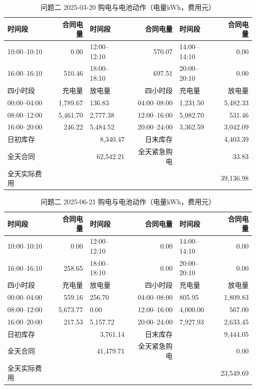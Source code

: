 \begin{table}[H]\centering\small\setlength{\tabcolsep}{4pt}\caption{问题二 2025-03-20 购电与电池动作（电量kWh，费用元）}\begin{tabular}{lrlrlr}\toprule
时间段&合同电量&时间段&合同电量&时间段&合同电量\\\midrule
10:00--10:10 & 0.00 & 12:00--12:10 & 570.07 & 14:00--14:10 & 0.00\\
16:00--16:10 & 510.46 & 18:00--18:10 & 697.51 & 20:00--20:10 & 0.00\\
\midrule 四小时段&充电量&放电量&四小时段&充电量&放电量\\\midrule
00:00--04:00 & 1,789.67 & 136.83 & 04:00--08:00 & 1,231.50 & 5,482.33\\
08:00--12:00 & 5,461.70 & 2,777.38 & 12:00--16:00 & 5,082.70 & 531.46\\
16:00--20:00 & 246.22 & 5,484.52 & 20:00--24:00 & 3,362.59 & 3,042.09\\
\midrule 日初库存 & \multicolumn{2}{r}{8,340.47} & 日末库存 & \multicolumn{2}{r}{4,403.39}\\
全天合同 & \multicolumn{2}{r}{62,542.21} & 全天紧急购电 & \multicolumn{2}{r}{33.83}\\
全天实际费用 & \multicolumn{5}{r}{39,136.98}\\\bottomrule\end{tabular}\end{table}
\begin{table}[H]\centering\small\setlength{\tabcolsep}{4pt}\caption{问题二 2025-06-21 购电与电池动作（电量kWh，费用元）}\begin{tabular}{lrlrlr}\toprule
时间段&合同电量&时间段&合同电量&时间段&合同电量\\\midrule
10:00--10:10 & 0.00 & 12:00--12:10 & 0.00 & 14:00--14:10 & 0.00\\
16:00--16:10 & 258.65 & 18:00--18:10 & 0.00 & 20:00--20:10 & 0.00\\
\midrule 四小时段&充电量&放电量&四小时段&充电量&放电量\\\midrule
00:00--04:00 & 559.16 & 256.70 & 04:00--08:00 & 805.95 & 1,809.83\\
08:00--12:00 & 5,673.77 & 0.00 & 12:00--16:00 & 4,000.00 & 567.00\\
16:00--20:00 & 217.53 & 5,157.72 & 20:00--24:00 & 7,927.93 & 2,633.45\\
\midrule 日初库存 & \multicolumn{2}{r}{3,761.14} & 日末库存 & \multicolumn{2}{r}{9,444.05}\\
全天合同 & \multicolumn{2}{r}{41,479.71} & 全天紧急购电 & \multicolumn{2}{r}{0.00}\\
全天实际费用 & \multicolumn{5}{r}{23,549.69}\\\bottomrule\end{tabular}\end{table}
